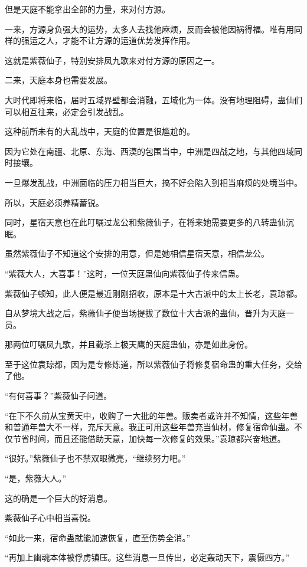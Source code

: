 \begin{this_body}
但是天庭不能拿出全部的力量，来对付方源。

一来，方源身负强大的运势，太多人去找他麻烦，反而会被他因祸得福。唯有用同样的强运之人，才能不让方源的运道优势发挥作用。

这就是紫薇仙子，特别安排凤九歌来对付方源的原因之一。

二来，天庭本身也需要发展。

大时代即将来临，届时五域界壁都会消融，五域化为一体。没有地理阻碍，蛊仙们可以相互往来，必定会引发战乱。

这种前所未有的大乱战中，天庭的位置是很尴尬的。

因为它处在南疆、北原、东海、西漠的包围当中，中洲是四战之地，与其他四域同时接壤。

一旦爆发乱战，中洲面临的压力相当巨大，搞不好会陷入到相当麻烦的处境当中。

所以，天庭必须养精蓄锐。

同时，星宿天意也在此叮嘱过龙公和紫薇仙子，在将来她需要更多的八转蛊仙沉眠。

虽然紫薇仙子不知道这个安排的用意，但是她相信星宿天意，相信龙公。

“紫薇大人，大喜事！”这时，一位天庭蛊仙向紫薇仙子传来信蛊。

紫薇仙子顿知，此人便是最近刚刚招收，原本是十大古派中的太上长老，袁琼都。

自从梦境大战之后，紫薇仙子便当场提拔了数位十大古派的蛊仙，晋升为天庭一员。

那两位叮嘱凤九歌，并且截杀上极天鹰的天庭蛊仙，亦是如此身份。

至于这位袁琼都，因为是专修炼道，所以紫薇仙子将修复宿命蛊的重大任务，交给了他。

“有何喜事？”紫薇仙子问道。

“在下不久前从宝黄天中，收购了一大批的年兽。贩卖者或许并不知情，这些年兽和普通年兽大不一样，充斥天意。我正可用这些年兽充当仙材，修复宿命仙蛊。不仅节省时间，而且还能借助天意，加快每一次修复的效果。”袁琼都兴奋地道。

“很好。”紫薇仙子也不禁双眼微亮，“继续努力吧。”

“是，紫薇大人。”

这的确是一个巨大的好消息。

紫薇仙子心中相当喜悦。

“如此一来，宿命蛊就能加速恢复，直至伤势全消。”

“再加上幽魂本体被俘虏镇压。这些消息一旦传出，必定轰动天下，震慑四方。”


\end{this_body}
